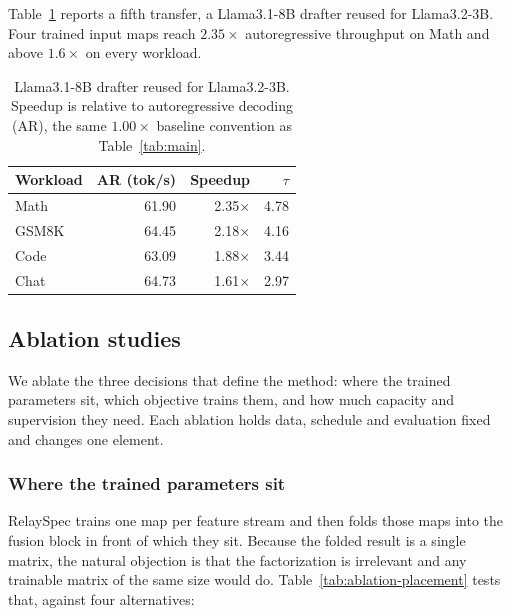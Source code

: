 Table~\ref{tab:llama-transfer} reports a fifth transfer, a Llama3.1-8B drafter reused for Llama3.2-3B. Four trained input maps reach $2.35\times$ autoregressive throughput on Math and above $1.6\times$ on every workload.

\begin{table}[t]
\centering
\caption{Llama3.1-8B drafter reused for Llama3.2-3B. Speedup is relative to autoregressive decoding (AR), the same $1.00\times$ baseline convention as Table~\ref{tab:main}.}
\label{tab:llama-transfer}
\small
\begin{tabular}{lrrr}
\toprule
Workload & AR (tok/s) & Speedup & $\tau$ \\
\midrule
Math & 61.90 & 2.35$\times$ & 4.78 \\
GSM8K & 64.45 & 2.18$\times$ & 4.16 \\
Code & 63.09 & 1.88$\times$ & 3.44 \\
Chat & 64.73 & 1.61$\times$ & 2.97 \\
\bottomrule
\end{tabular}
\end{table}

\FloatBarrier
\subsection{Ablation studies}
\label{sec:ablations}
We ablate the three decisions that define the method: where the trained parameters sit, which objective trains them, and how much capacity and supervision they need. Each ablation holds data, schedule and evaluation fixed and changes one element.

\subsubsection{Where the trained parameters sit}
\label{sec:ablation-placement}
RelaySpec trains one map per feature stream and then folds those maps into the fusion block in front of which they sit. Because the folded result is a single matrix, the natural objection is that the factorization is irrelevant and any trainable matrix of the same size would do. Table~\ref{tab:ablation-placement} tests that, against four alternatives:

